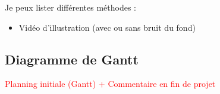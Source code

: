 Je peux lister différentes méthodes :
\begin{itemize}
    \item Vidéo d'illustration (avec ou sans bruit du fond)
\end{itemize}

\subsection{Diagramme de Gantt}\label{subsec:diagramme-de-gantt}


\textcolor{red}{Planning initiale  (Gantt) + Commentaire en fin de projet}




